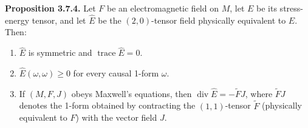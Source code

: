 \textbf{Proposition 3.7.4.} Let $F$ be an electromagnetic field on $M$, let $E$ be its stress-energy tensor, and let $\hat{E}$ be the $(2,0)$-tensor field physically equivalent to $E$. Then:

\begin{enumerate}
\item[(a)] $\hat{E}$ is symmetric and $\operatorname{trace} \hat{E} = 0$.
\item[(b)] $\hat{E}(\omega, \omega) \geq 0$ for every causal 1-form $\omega$.
\item[(c)] If $(M, F, J)$ obeys Maxwell's equations, then $\operatorname{div} \hat{E} = -\tilde{F}J$, where $\tilde{F}J$ denotes the 1-form obtained by contracting the $(1,1)$-tensor $\tilde{F}$ (physically equivalent to $F$) with the vector field $J$.
\end{enumerate}
